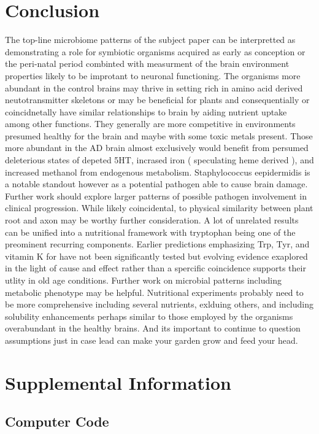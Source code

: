 \documentclass[aps,secnumarabic,balancelastpage,amsmath,amssymb,nofootinbib]{revtex4}
\begin{document}
\section{Conclusion}
The top-line microbiome patterns of the subject paper 
\cite{10.3389/fcimb.2023.1123228} 
can be interpretted as demonstrating a role for symbiotic organisms
acquired as early as conception or the peri-natal period 
combinted with  measurment of  the brain environment properties likely to be
improtant to neuronal functioning. 
The organisms more abundant
in the control brains 
may thrive in setting rich in amino acid derived neutotransmitter
skeletons or 
may be beneficial for plants and consequentially
or coincidnetally have similar relationships to brain 
by aiding nutrient uptake among other functions. They
generally are more competitive in environments presumed
healthy for the brain and maybe with some toxic metals present. 
Those more abundant in the AD brain almost exclusively 
would benefit from persumed deleterious states of 
depeted 5HT, incrased iron ( speculating heme derived ),
and increased methanol from endogenous metabolism. 
Staphylococcus eepidermidis is a notable standout however
as a potential pathogen able to cause brain damage.
Further work should explore larger patterns of possible pathogen
involvement in clinical progression.  
While likely coincidental, to physical similarity between
plant root and axon may be worthy further consideration.
A lot of unrelated results can be unified into a nutritional framework
with tryptophan being one of the preominent recurring components.
Earlier predictions emphasizing Trp, Tyr, and vitamin K
for \mjmdisease  have not been significantly tested but 
evolving evidence exaplored in the light of cause and effect
rather than a spercific coincidence supports their utlity
in old age conditions. Further work on microbial patterns including
metabolic phenotype may be helpful. Nutritional experiments probably
need to be more comprehensive including several nutrients, exlduing
others, and including solubility enhancements perhaps similar
to those employed by the organisms overabundant in the healthy brains.  
And its important to continue to question assumptions just in 
case lead can make your garden grow and feed your head.

\section{Supplemental Information}

\subsection{Computer Code}
\end{document}
